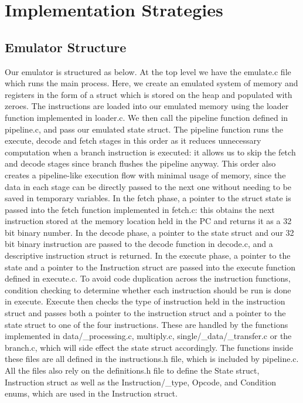 \documentclass[11pt]{article}
\begin{document}
  \section*{Implementation Strategies}

  \subsection*{Emulator Structure}

Our emulator is structured as below. At the top level we have the emulate.c file which runs the main process. Here, we create an emulated system of memory and registers in the form of a struct which is stored on the heap and populated with zeroes. The instructions are loaded into our emulated memory using the loader function implemented in loader.c. We then call the pipeline function defined in pipeline.c, and pass our emulated state struct. The pipeline function runs the execute, decode and fetch stages in this order as it reduces unnecessary computation when a branch instruction is executed: it allows us to skip the fetch and decode stages since branch flushes the pipeline anyway. This order also creates a pipeline-like execution flow with minimal usage of memory, since the data in each stage can be directly passed to the next one without needing to be saved in temporary variables. In the fetch phase, a pointer to the struct state is passed into the fetch function implemented in fetch.c: this obtains the next instruction stored at the memory location held in the PC and returns it as a 32 bit binary number. In the decode phase, a pointer to the state struct and our 32 bit binary instruction are passed to the decode function in decode.c, and a descriptive instruction struct is returned. In the execute phase, a pointer to the state and a pointer to the Instruction struct are passed into the execute function defined in execute.c. To avoid code duplication across the instruction functions, condition checking to determine whether each instruction should be run is done in execute. Execute then checks the type of instruction held in the instruction struct and passes both a pointer to the instruction struct and a pointer to the state struct to one of the four instructions. These are handled by the functions implemented in data/_processing.c, multiply.c, single/_data/_transfer.c or the branch.c, which will side effect the state struct accordingly. The functions inside these files are all defined in the instructions.h file, which is included by pipeline.c. All the files also rely on the definitions.h file to define the State struct, Instruction struct as well as the Instruction/_type, Opcode, and Condition enums, which are used in the Instruction struct. 
\end{document}
